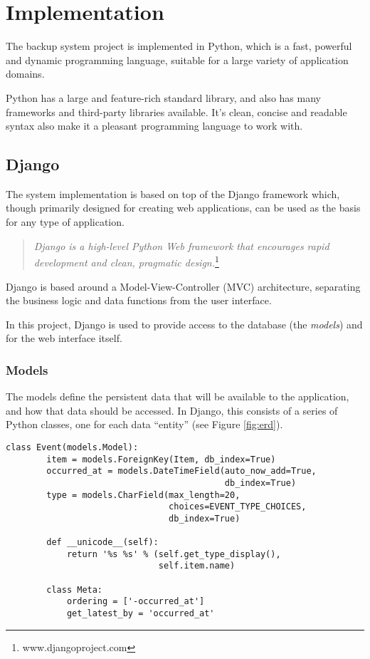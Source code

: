 \chapter{Implementation}

The backup system project is implemented in Python, which is a fast, powerful
and dynamic programming language, suitable for a large variety of application
domains.

Python has a large and feature-rich standard library, and also has many
frameworks and third-party libraries available. It's clean, concise and
readable syntax also make it a pleasant programming language to work with.

\section{Django}

The system implementation is based on top of the Django framework which, though
primarily designed for creating web applications, can be used as the basis for
any type of application.

\begin{quote}
    \emph{Django is a high-level Python Web framework that encourages rapid
    development and clean, pragmatic design.}\footnote{www.djangoproject.com}
\end{quote}

Django is based around a Model-View-Controller (MVC) architecture, separating
the business logic and data functions from the user interface.

In this project, Django is used to provide access to the database (the
\emph{models}) and for the web interface itself.

\subsection{Models}

The models define the persistent data that will be available to the
application, and how that data should be accessed. In Django, this consists of
a series of Python classes, one for each data ``entity'' (see Figure
\ref{fig:erd}).

\begin{singlespacing}
\begin{lstlisting}[caption=The `Event' model, label=lst:event-model]
    class Event(models.Model):
        item = models.ForeignKey(Item, db_index=True)
        occurred_at = models.DateTimeField(auto_now_add=True,
                                           db_index=True)
        type = models.CharField(max_length=20,
                                choices=EVENT_TYPE_CHOICES,
                                db_index=True)

        def __unicode__(self):
            return '%s %s' % (self.get_type_display(),
                              self.item.name)

        class Meta:
            ordering = ['-occurred_at']
            get_latest_by = 'occurred_at'
\end{lstlisting}
\end{singlespacing}

